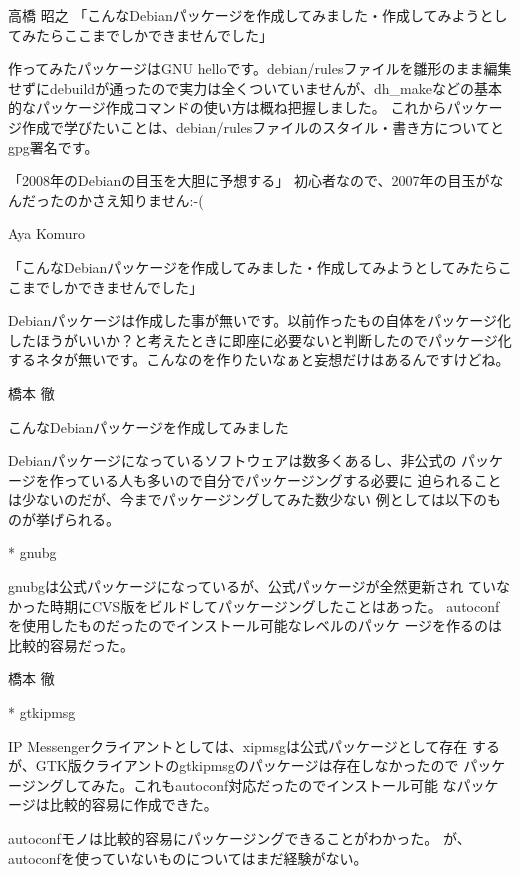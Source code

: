 \documentclass[cjk,dvipdfmx,12pt]{beamer}
\begin{document}
\begin{frame}{高橋 昭之}
「こんなDebianパッケージを作成してみました・作成してみようとしてみたらここまでしかできませんでした」

作ってみたパッケージはGNU helloです。debian/rulesファイルを雛形のまま編集せずにdebuildが通ったので実力は全くついていませんが、dh\_makeなどの基本的なパッケージ作成コマンドの使い方は概ね把握しました。
これからパッケージ作成で学びたいことは、debian/rulesファイルのスタイル・書き方についてとgpg署名です。

「2008年のDebianの目玉を大胆に予想する」
初心者なので、2007年の目玉がなんだったのかさえ知りません:-(

\end{frame}\begin{frame}{Aya Komuro}

「こんなDebianパッケージを作成してみました・作成してみようとしてみたらこ
こまでしかできませんでした」

Debianパッケージは作成した事が無いです。以前作ったもの自体をパッケージ化
したほうがいいか？と考えたときに即座に必要ないと判断したのでパッケージ化
するネタが無いです。こんなのを作りたいなぁと妄想だけはあるんですけどね。

\end{frame}\begin{frame}{橋本 徹}

こんなDebianパッケージを作成してみました

Debianパッケージになっているソフトウェアは数多くあるし、非公式の
パッケージを作っている人も多いので自分でパッケージングする必要に
迫られることは少ないのだが、今までパッケージングしてみた数少ない
例としては以下のものが挙げられる。

* gnubg

gnubgは公式パッケージになっているが、公式パッケージが全然更新され
ていなかった時期にCVS版をビルドしてパッケージングしたことはあった。
autoconfを使用したものだったのでインストール可能なレベルのパッケ
ージを作るのは比較的容易だった。

\end{frame}\begin{frame}{橋本 徹}

* gtkipmsg

IP Messengerクライアントとしては、xipmsgは公式パッケージとして存在
するが、GTK版クライアントのgtkipmsgのパッケージは存在しなかったので
パッケージングしてみた。これもautoconf対応だったのでインストール可能
なパッケージは比較的容易に作成できた。

autoconfモノは比較的容易にパッケージングできることがわかった。
が、autoconfを使っていないものについてはまだ経験がない。


\end{frame}
\end{document}
